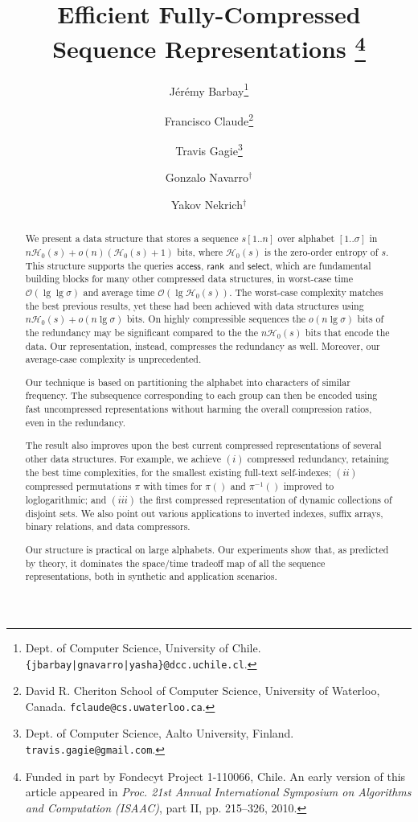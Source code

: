 \documentclass[11pt]{article}
\providecommand{\pii}{\ensuremath{\pi^{-1}}}
\newcommand{\Oh}[1]
    {\ensuremath{\mathcal{O}\left( {#1} \right)}}
\newcommand{\access}
    {\ensuremath{\mathsf{access}}}
\newcommand{\rank}
    {\ensuremath{\mathsf{rank}}}
\newcommand{\select}
    {\ensuremath{\mathsf{select}}}
\newcommand{\HH}{\mathcal{H}}
\newcommand{\Ho}{\HH_0}
\begin{document}
\title{Efficient Fully-Compressed Sequence Representations
\thanks{Funded in part by Fondecyt Project 1-110066, Chile.
An early version of this article appeared in {\em Proc. 21st Annual 
International Symposium on Algorithms and Computation (ISAAC)}, part II,
pp. 215--326, 2010.}
}

\author{J\'{e}r\'{e}my Barbay\thanks{Dept. of Computer Science, 
        University of Chile. {\tt \{jbarbay|gnavarro|yasha\}@dcc.uchile.cl}.}
\and
    Francisco Claude\thanks{David R. Cheriton School of Computer Science,
University of Waterloo, Canada. {\tt fclaude@cs.uwaterloo.ca}.}
\and
    Travis Gagie\thanks{Dept. of Computer Science, Aalto University, Finland. 
    {\tt travis.gagie@gmail.com}.}
\and
    Gonzalo Navarro$^\dag$
\and
    Yakov Nekrich$^\dag$
}

\date{}
\maketitle

\setcounter{footnote}{0}

\begin{abstract}
  We present a data structure that stores a sequence $s[1..n]$ over
  alphabet $[1..\sigma]$ in $n\Ho(s) + o(n)(\Ho(s){+}1)$ bits, where
  $\Ho(s)$ is the zero-order entropy of $s$.
This structure supports the queries \access, \rank\ and \select,
  which are fundamental building blocks for many other compressed data 
  structures, in worst-case time $\Oh{\lg\lg\sigma}$
  and average time $\Oh{\lg \Ho(s)}$.
The worst-case complexity matches the best previous results, yet these had
  been achieved with data structures using $n\Ho(s)+o(n\lg\sigma)$ bits. 
  On highly compressible sequences the $o(n\lg\sigma)$ bits of the redundancy 
  may be significant compared to the the $n\Ho(s)$ bits that encode the data. 
  Our representation, instead, compresses the redundancy as well. Moreover, our 
  average-case complexity is unprecedented.
  
  Our technique is based on partitioning the alphabet into characters of 
  similar frequency. The subsequence corresponding to each group can then be 
  encoded using fast uncompressed representations without harming the overall
  compression ratios, even in the redundancy.
  
  The result also improves upon the best current compressed
  representations of several other data structures.
For example, we achieve
  $(i)$ compressed redundancy, retaining the best time complexities, for the 
  smallest existing full-text self-indexes; 
  $(ii)$ compressed permutations $\pi$ with times for $\pi()$ and 
  $\pii()$ improved to loglogarithmic; and 
  $(iii)$ the first compressed representation of dynamic collections of 
  disjoint sets.
We also point out various applications to inverted indexes,
  suffix arrays, binary relations, and data compressors.

  Our structure is practical on large alphabets. Our experiments show that,
  as predicted by theory, it dominates the space/time tradeoff map
  of all the sequence representations, both in synthetic and application
  scenarios.
\end{abstract}
\end{document}
